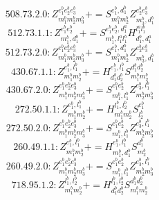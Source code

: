 \documentclass[letterpaper,10pt,fleqn,leqno,onecolumn]{article}
\begin{document}
\begin{equation} \;\;\;\;\;\;  508.73.2.0: Z^{e_{1}^{b}e_{2}^{b}e_{3}^{b}}_{m_{1}^{b}m_{2}^{b}m_{3}^{b}}+=S^{e_{1}^{b},d_{1}^{b}}_{m_{1}^{b}m_{2}^{b}}Z^{e_{2}^{b}e_{3}^{b}}_{m_{3}^{b},d_{1}^{b}} \end{equation}
\begin{equation} \;\;\;\;\;\;  512.73.1.1: Z^{e_{1}^{b}e_{2}^{b}}_{m_{1}^{b},d_{1}^{b}}+=S^{e_{1}^{b}e_{2}^{b},d_{1}^{a}}_{m_{1}^{b},l_{1}^{a}l_{1}^{b}}H^{l_{1}^{a}l_{1}^{b}}_{d_{1}^{b},d_{1}^{a}} \end{equation}
\begin{equation} \;\;\;\;\;\;  512.73.2.0: Z^{e_{1}^{b}e_{2}^{b}e_{3}^{b}}_{m_{1}^{b}m_{2}^{b}m_{3}^{b}}+=S^{e_{1}^{b},d_{1}^{b}}_{m_{1}^{b}m_{2}^{b}}Z^{e_{2}^{b}e_{3}^{b}}_{m_{3}^{b},d_{1}^{b}} \end{equation}
\begin{equation} \;\;\;\;\;\;  430.67.1.1: Z^{e_{1}^{b},l_{1}^{b}}_{m_{1}^{b}m_{2}^{b}}+=H^{e_{1}^{b},l_{1}^{b}}_{d_{1}^{b}d_{2}^{b}}S^{d_{1}^{b}d_{2}^{b}}_{m_{1}^{b}m_{2}^{b}} \end{equation}
\begin{equation} \;\;\;\;\;\;  430.67.2.0: Z^{e_{1}^{b}e_{2}^{b}e_{3}^{b}}_{m_{1}^{b}m_{2}^{b}m_{3}^{b}}+=S^{e_{1}^{b}e_{2}^{b}}_{m_{1}^{b},l_{1}^{b}}Z^{e_{3}^{b},l_{1}^{b}}_{m_{2}^{b}m_{3}^{b}} \end{equation}
\begin{equation} \;\;\;\;\;\;  272.50.1.1: Z^{e_{1}^{b},l_{1}^{b}}_{m_{1}^{b}m_{2}^{b}}+=H^{l_{1}^{b},l_{2}^{b}}_{m_{1}^{b}m_{2}^{b}}S^{e_{1}^{b}}_{l_{2}^{b}} \end{equation}
\begin{equation} \;\;\;\;\;\;  272.50.2.0: Z^{e_{1}^{b}e_{2}^{b}e_{3}^{b}}_{m_{1}^{b}m_{2}^{b}m_{3}^{b}}+=S^{e_{1}^{b}e_{2}^{b}}_{m_{1}^{b},l_{1}^{b}}Z^{e_{3}^{b},l_{1}^{b}}_{m_{2}^{b}m_{3}^{b}} \end{equation}
\begin{equation} \;\;\;\;\;\;  260.49.1.1: Z^{e_{1}^{b},l_{1}^{b}}_{m_{1}^{b}m_{2}^{b}}+=H^{e_{1}^{b},l_{1}^{b}}_{m_{1}^{b},d_{1}^{b}}S^{d_{1}^{b}}_{m_{2}^{b}} \end{equation}
\begin{equation} \;\;\;\;\;\;  260.49.2.0: Z^{e_{1}^{b}e_{2}^{b}e_{3}^{b}}_{m_{1}^{b}m_{2}^{b}m_{3}^{b}}+=S^{e_{1}^{b}e_{2}^{b}}_{m_{1}^{b},l_{1}^{b}}Z^{e_{3}^{b},l_{1}^{b}}_{m_{2}^{b}m_{3}^{b}} \end{equation}
\begin{equation} \;\;\;\;\;\;  718.95.1.2: Z^{l_{1}^{b},l_{2}^{b}}_{m_{1}^{b}m_{2}^{b}}+=H^{l_{1}^{b},l_{2}^{b}}_{d_{1}^{b}d_{2}^{b}}S^{d_{1}^{b}d_{2}^{b}}_{m_{1}^{b}m_{2}^{b}} \end{equation}
\end{document}
